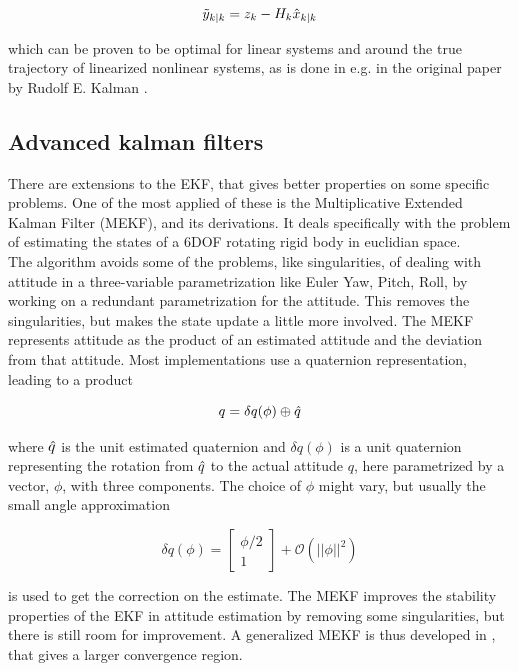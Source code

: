 \begin{equation}
    \Tilde{y}_{k|k} = z_k - H_k\hat{x}_{k|k}
\end{equation}

which can be proven to be optimal for linear systems and around the true trajectory of linearized nonlinear systems, as is done in e.g. in the original paper by Rudolf E. Kalman \cite{kalmanOG}.

\subsection{Advanced kalman filters}
There are extensions to the EKF, that gives better properties on some specific problems. One of the most applied of these is the Multiplicative Extended Kalman Filter (MEKF)\cite{MEKF}, and its derivations. It deals specifically with the problem of estimating the states of a 6DOF rotating rigid body in euclidian space. \\ 

The algorithm avoids some of the problems, like singularities, of dealing with attitude in a three-variable parametrization like Euler Yaw, Pitch, Roll, by working on a redundant parametrization for the attitude. This removes the singularities, but makes the state update a little more involved. The MEKF represents attitude as the product of an estimated attitude and the deviation from that attitude. Most implementations use a quaternion representation, leading to a product 

\begin{equation}
    q = \delta q(\phi)\oplus \Hat{q}
\end{equation}

where $\Hat{q}$ is the unit estimated quaternion and $\delta q(\phi)$ is a unit quaternion representing the rotation from $\Hat{q}$ to the actual attitude $q$, here parametrized by a vector, $\phi$, with three components. The choice of $\phi$ might vary, but usually the small angle approximation

\begin{equation}
    \delta q(\phi) = \begin{bmatrix} \phi / 2 \\ 1 \end{bmatrix} + \mathcal{O}(||\phi||^2)
\end{equation}

is used to get the correction on the estimate. The MEKF improves the stability properties of the EKF in attitude estimation by removing some singularities, but there is still room for improvement. A generalized MEKF is thus developed in \cite{GMEKF}, that gives a larger convergence region. \\ 

